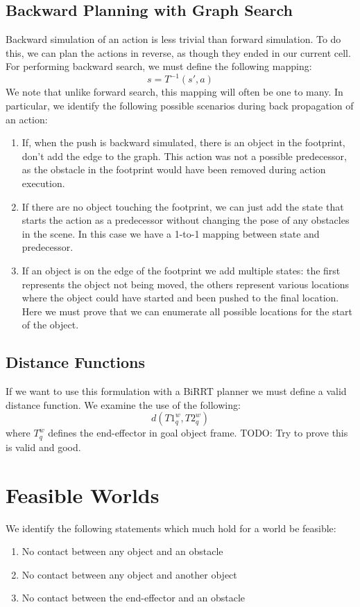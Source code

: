 \documentclass[11pt, oneside]{article}   	%
\begin{document}
\subsection*{Backward Planning with Graph Search}
Backward simulation of an action is less trivial than forward simulation.  To do this, we can plan the actions in reverse, as though they ended in our current cell.  For performing backward search, we must define the following mapping:
\[ s = T^{-1}(s', a) \]
We note that unlike forward search, this mapping will often be one to many.  In particular, we identify the following possible scenarios during back propagation of an action:
\begin{enumerate}
\item If, when the push is backward simulated, there is an object in the footprint, don't add the edge to the graph. This action was not a possible predecessor, as the obstacle in the footprint would have been removed during action execution.
\item If there are no object touching the footprint, we can just add the state that starts the action as a predecessor without changing the pose of any obstacles in the scene.  In this case we have a 1-to-1 mapping between state and predecessor.
\item If an object is on the edge of the footprint we add multiple states: the first represents the object not being moved, the others represent various locations where the object could have started and been pushed to the final location.  Here we must prove that we can enumerate all possible locations for the start of the object.
\end{enumerate}

\subsection*{Distance Functions}
If we want to use this formulation with a BiRRT planner we must define a valid distance function.  We examine the use of the following:
\[ d(T1_q^w, T2_q^w) \]
where $T_q^w$ defines the end-effector in goal object frame.
TODO: Try to prove this is valid and good.
\section*{Feasible Worlds}
We identify the following statements which much hold for a world be feasible:
\begin{enumerate}
\item No contact between any object and an obstacle
\item No contact between any object and another object
\item No contact between the end-effector and an obstacle
\end{enumerate}
\end{document}
